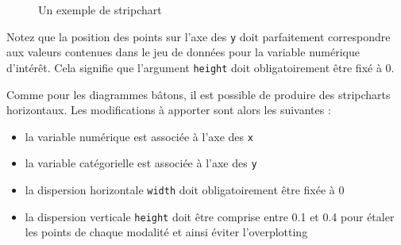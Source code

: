 \documentclass[
  a4paper,
  DIV=11,
  numbers=noendperiod,
  oneside]{scrreprt}
\providecommand{\tightlist}{%
  \setlength{\itemsep}{0pt}\setlength{\parskip}{0pt}}\usepackage{longtable,booktabs,array}
\begin{document}
\begin{figure}[H]


\caption{\label{fig-facstrip}Un exemple de stripchart}

\end{figure}%

Notez que la position des points sur l'axe des \texttt{y} doit
parfaitement correspondre aux valeurs contenues dans le jeu de données
pour la variable numérique d'intérêt. Cela signifie que l'argument
\texttt{height} doit obligatoirement être fixé à 0.

Comme pour les diagrammes bâtons, il est possible de produire des
stripcharts horizontaux. Les modifications à apporter sont alors les
suivantes :

\begin{itemize}
\tightlist
\item
  la variable numérique est associée à l'axe des \texttt{x}
\item
  la variable catégorielle est associée à l'axe des \texttt{y}
\item
  la dispersion horizontale \texttt{width} doit obligatoirement être
  fixée à 0
\item
  la dispersion verticale \texttt{height} doit être comprise entre 0.1
  et 0.4 pour étaler les points de chaque modalité et ainsi éviter
  l'overplotting
\end{itemize}
\end{document}
